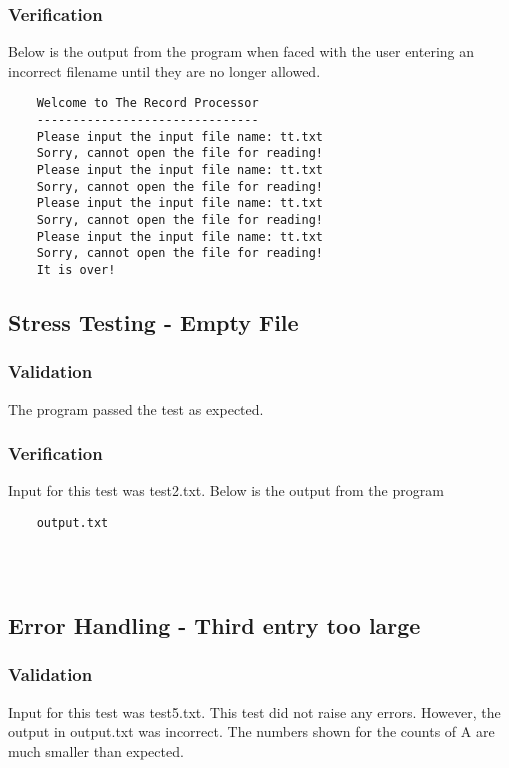 \documentclass[]{article}
\begin{document}
	\subsubsection{Verification}
	Below is the output from the program when faced with the user entering an
	incorrect filename until they are no longer allowed.
	
	\begin{lstlisting}
	Welcome to The Record Processor
	-------------------------------
	Please input the input file name: tt.txt
	Sorry, cannot open the file for reading!
	Please input the input file name: tt.txt
	Sorry, cannot open the file for reading!
	Please input the input file name: tt.txt
	Sorry, cannot open the file for reading!
	Please input the input file name: tt.txt
	Sorry, cannot open the file for reading!
	It is over!
	\end{lstlisting}


	\newpage
	

\subsection{Stress Testing - Empty File}
	\subsubsection{Validation}
	The program passed the test as expected.
	
	\subsubsection{Verification}
	Input for this test was test2.txt.  Below is the output from the program
	\begin{lstlisting}
	output.txt
	
	
	
	\end{lstlisting}
	
	\newpage
	

\subsection{Error Handling - Third entry too large}
	\subsubsection{Validation}
	Input for this test was test5.txt.  This test did not raise any errors. 
	However, the output in output.txt was incorrect.  The numbers shown for the counts of A are much smaller than
	expected.
	
\end{document}
